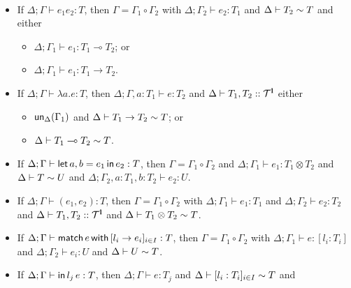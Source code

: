 \begin{lemma}\
  \label{lem:inversion}


  \begin{itemize}
  \item %
    If $\Delta;\Gamma \vdash e_1e_2 : T$, then
    $\Gamma = \Gamma_1 \circ \Gamma_2$ with 
    $\Delta;\Gamma_2 \vdash e_2: T_1$ and
    $\Delta \vdash T_2 \sim T$ and either
    \begin{itemize}
    \item $\Delta;\Gamma_1 \vdash e_1: T_1 \multimap T_2$; or 
    \item $\Delta;\Gamma_1 \vdash e_1: T_1 \rightarrow T_2$.
    \end{itemize}
  \item %
    If $\Delta;\Gamma \vdash \lambda a.e : T$, then
    $\Delta;\Gamma, a:T_1 \vdash e: T_2$ and
    $\Delta \vdash T_1, T_2 ::\mathcal T^{\mathbf{l}}$
    either
    \begin{itemize}
    \item $\mathsf{un}_\Delta (\Gamma_1)$ and $\Delta \vdash T_1 \to T_2
      \sim T$; or
    \item  $\Delta \vdash T_1 \multimap T_2      \sim T$.
    \end{itemize}
  \item %
    If $\Delta;\Gamma \vdash \mathsf{let}\,{a,b}={e_1}\,\mathsf{in}\,{e_2} : T$, then
    $\Gamma = \Gamma_1 \circ \Gamma_2$ and
    $\Delta;\Gamma_1 \vdash e_1: T_1 \otimes T_2$ and
    $\Delta \vdash T \sim U$ and
    $\Delta;\Gamma_2 ,a\colon T_1,b\colon T_2 \vdash e_2: U$.
  \item %
    If $\Delta;\Gamma \vdash (e_1, e_2) : T$, then
    $\Gamma = \Gamma_1\circ \Gamma_2$ with 
    $\Delta;\Gamma_1 \vdash e_1: T_1$ and
    $\Delta;\Gamma_2 \vdash e_2: T_2$ and
    $\Delta \vdash T_1, T_2 ::\mathcal T^{\mathbf{l}}$ and
    $\Delta \vdash T_1\otimes T_2 \sim T$.
  \item %
    If $\Delta;\Gamma \vdash \mathsf{match}\,{e}\,\mathsf{with}\,[{l_i\rightarrow e_i}]_{i\in
      I} : T$, then
    $\Gamma =  \Gamma_1 \circ \Gamma_2$ with
    $\Delta; \Gamma_1 \vdash e : [l_i : T_i]$ and
    $\Delta; \Gamma_2 \vdash e_i : U$ and
    $\Delta \vdash U \sim T$.
  \item %
    If $\Delta;\Gamma \vdash \mathsf{in}\,l_j\,e : T$, then
    $\Delta;\Gamma \vdash e: T_j$ and
    $\Delta \vdash [l_i:T_i]_{i\in I} \sim T$ and

\end{itemize}
\end{lemma}
